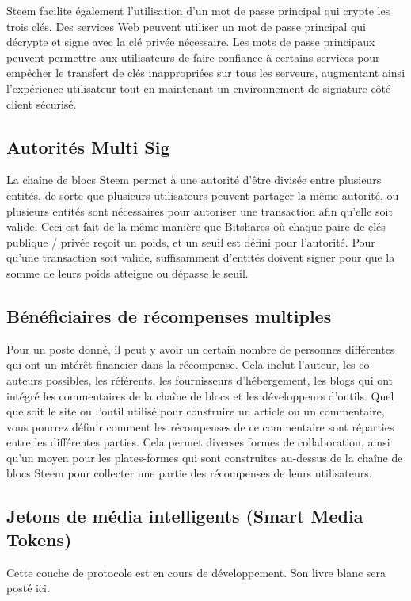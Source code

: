 \documentclass[11pt]{article}
\begin{document}
Steem facilite également l'utilisation d'un mot de passe principal
qui crypte les trois clés. Des services Web peuvent utiliser un mot de
passe principal qui décrypte et signe avec la clé privée
nécessaire. Les mots de passe principaux peuvent permettre aux
utilisateurs de faire confiance à certains services pour empêcher
le transfert de clés inappropriées sur tous les serveurs,
augmentant ainsi l'expérience utilisateur tout en maintenant un
environnement de signature côté client sécurisé.

\subsection{Autorités Multi Sig}
\label{sec:org77f9e26}
La chaîne de blocs Steem permet à une autorité d'être divisée entre
plusieurs entités, de sorte que plusieurs utilisateurs peuvent
partager la même autorité, ou plusieurs entités sont nécessaires
pour autoriser une transaction afin qu'elle soit valide. Ceci est
fait de la même manière que Bitshares où chaque paire de clés
publique / privée reçoit un poids, et un seuil est défini pour
l'autorité. Pour qu'une transaction soit valide, suffisamment
d'entités doivent signer pour que la somme de leurs poids atteigne
ou dépasse le seuil.

\subsection{Bénéficiaires de récompenses multiples}
\label{sec:org50fc79c}
Pour un poste donné, il peut y avoir un certain nombre de personnes
différentes qui ont un intérêt financier dans la récompense. Cela
inclut l'auteur, les co-auteurs possibles, les référents, les
fournisseurs d'hébergement, les blogs qui ont intégré les
commentaires de la chaîne de blocs et les développeurs
d'outils. Quel que soit le site ou l'outil utilisé pour construire
un article ou un commentaire, vous pourrez définir comment les
récompenses de ce commentaire sont réparties entre les différentes
parties. Cela permet diverses formes de collaboration, ainsi qu'un
moyen pour les plates-formes qui sont construites au-dessus de la
chaîne de blocs Steem pour collecter une partie des récompenses de leurs
utilisateurs.

\subsection{Jetons de média intelligents (Smart Media Tokens)}
\label{sec:org6675685}
Cette couche de protocole est en cours de développement. Son livre
blanc sera posté ici.
\end{document}
